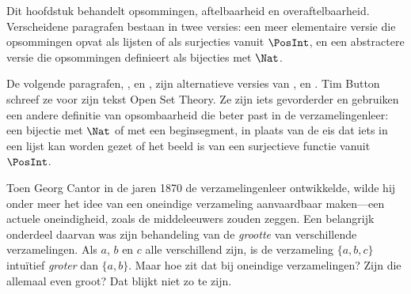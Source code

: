 \documentclass[openany]{memoir}
\begin{document}

\begin{editorial}
Dit hoofdstuk behandelt opsommingen, aftelbaarheid en
overaftelbaarheid. Verscheidene paragrafen bestaan in twee versies: een
meer elementaire versie die opsommingen opvat als lijsten of als
surjecties vanuit $\PosInt$, en een abstractere versie die opsommingen
definieert als bijecties met $\Nat$.
\end{editorial}











\begin{editorial}
De volgende paragrafen, ,
 en , zijn
alternatieve versies van ,
 en . Tim Button
schreef ze voor zijn tekst Open Set Theory. Ze zijn iets gevorderder
en gebruiken een andere definitie van opsombaarheid die beter past in
de verzamelingenleer: een bijectie met $\Nat$ of met een beginsegment,
in plaats van de eis dat iets in een lijst kan worden gezet of het
beeld is van een surjectieve functie vanuit $\PosInt$.
\end{editorial}
\endgroup

\begingroup
\def\olfilename{OLP-0028}
\def\olfilepath{content/sets-functions-relations/size-of-sets/}
\hypertarget{unit-OLP-0028}{}





Toen Georg Cantor in de jaren 1870 de verzamelingenleer ontwikkelde, wilde hij
onder meer het idee van een oneindige verzameling aanvaardbaar maken---een
actuele oneindigheid, zoals de middeleeuwers zouden zeggen. Een belangrijk
onderdeel daarvan was zijn behandeling van de \emph{grootte} van verschillende
verzamelingen. Als $a$, $b$ en $c$ alle verschillend zijn, is de verzameling
$\{a, b, c\}$ intuïtief \emph{groter} dan $\{a, b\}$. Maar hoe zit dat bij
oneindige verzamelingen? Zijn die allemaal even groot? Dat blijkt niet zo te
zijn.
\end{document}
